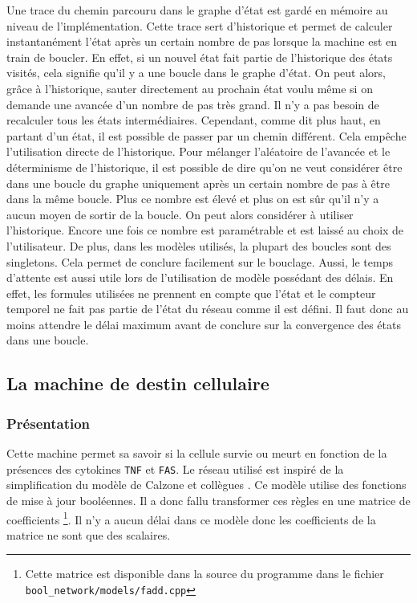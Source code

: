 \documentclass[11pt, a4paper]{article}
\begin{document}
Une trace du chemin parcouru dans le graphe d'état est gardé en mémoire au
niveau de l'implémentation. Cette trace sert d'historique et permet de calculer
instantanément l'état après un certain nombre de pas lorsque la machine est en
train de boucler. En effet, si un nouvel état fait partie de l'historique des
états visités, cela signifie qu'il y a une boucle dans le graphe d'état. On
peut alors, grâce à l'historique, sauter directement au prochain état voulu
même si on demande une avancée d'un nombre de pas très grand. Il n'y a pas
besoin de recalculer tous les états intermédiaires. Cependant, comme dit plus
haut, en partant d'un état, il est possible de passer par un chemin différent.
Cela empêche l'utilisation directe de l'historique. Pour mélanger l'aléatoire
de l'avancée et le déterminisme de l'historique, il est possible de dire qu'on
ne veut considérer être dans une boucle du graphe uniquement après un certain
nombre de pas à être dans la même boucle. Plus ce nombre est élevé et plus on
est sûr qu'il n'y a aucun moyen de sortir de la boucle. On peut alors
considérer à utiliser l'historique. Encore une fois ce nombre est paramétrable
et est laissé au choix de l'utilisateur. De plus, dans les modèles utilisés, la
plupart des boucles sont des singletons. Cela permet de conclure facilement sur
le bouclage. Aussi, le temps d'attente est aussi utile lors de l'utilisation de
modèle possédant des délais. En effet, les formules utilisées ne prennent en
compte que l'état et le compteur temporel ne fait pas partie de l'état du
réseau comme il est défini. Il faut donc au moins attendre le délai maximum
avant de conclure sur la convergence des états dans une boucle.

\subsection{La machine de destin cellulaire}
\subsubsection{Présentation}
Cette machine permet sa savoir si la cellule survie ou meurt en fonction de la
présences des cytokines \texttt{TNF} et \texttt{FAS}. Le réseau utilisé est
inspiré de la simplification du modèle de Calzone et collègues \cite{calzone2010}. Ce
modèle utilise des fonctions de mise à jour booléennes. Il a donc fallu
transformer ces règles en une matrice de coefficients \footnote{Cette matrice
est disponible dans la source du programme dans le fichier
\texttt{bool\_network/models/fadd.cpp}}. Il n'y a aucun délai dans ce modèle
donc les coefficients de la matrice ne sont que des scalaires. 
\end{document}
